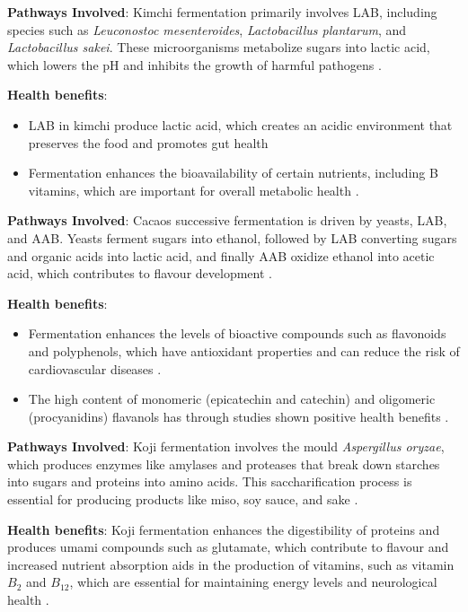 \textbf{Pathways Involved}: Kimchi fermentation primarily involves LAB, including species such as \textit{Leuconostoc mesenteroides}, \textit{Lactobacillus plantarum}, and \textit{Lactobacillus sakei}. These microorganisms metabolize sugars into lactic acid, which lowers the pH and inhibits the growth of harmful pathogens \cite*{LS14}.

\textbf{Health benefits}:
\begin{itemize}
    \item LAB in kimchi produce lactic acid, which creates an acidic environment that preserves the food and promotes gut health \cite*{LS14}
    \item Fermentation enhances the bioavailability of certain nutrients, including B vitamins, which are important for overall metabolic health \cite*{LS19}.
\end{itemize}

\textbf{Pathways Involved}: Cacaos successive fermentation is driven by yeasts, LAB, and AAB. Yeasts ferment sugars into ethanol, followed by LAB converting sugars and organic acids into lactic acid, and finally AAB oxidize ethanol into acetic acid, which contributes to flavour development \cite*{ORM_1}.

\textbf{Health benefits}:
\begin{itemize}
    \item Fermentation enhances the levels of bioactive compounds such as flavonoids and polyphenols, which have antioxidant properties and can reduce the risk of cardiovascular diseases \cite*{ORM_1}.
    \item The high content of monomeric (epicatechin and catechin) and oligomeric (procyanidins) flavanols has through studies shown positive health benefits \cite*{ORM_1}.
\end{itemize}

\textbf{Pathways Involved}: Koji fermentation involves the mould \textit{Aspergillus oryzae}, which produces enzymes like amylases and proteases that break down starches into sugars and proteins into amino acids. This saccharification process is essential for producing products like miso, soy sauce, and sake \cite*{LS11}.

\textbf{Health benefits}:
Koji fermentation enhances the digestibility of proteins and produces umami compounds such as glutamate, which contribute to flavour and increased nutrient absorption aids in the production of vitamins, such as vitamin $B_2$ and $B_{12}$, which are essential for maintaining energy levels and neurological health \cite*{LS11}.

